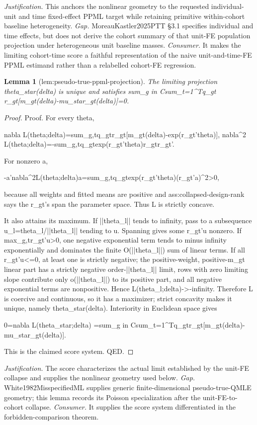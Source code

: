 \documentclass{article}
\newtheorem{lemma}{Lemma}
\begin{document}
\par\smallskip\noindent \textit{Justification.} This anchors the nonlinear geometry to the requested individual-unit and time fixed-effect PPML target while retaining primitive within-cohort baseline heterogeneity. \textit{Gap.} MoreauKastler2025PTT §3.1 specifies individual and time effects, but does not derive the cohort summary of that unit-FE population projection under heterogeneous unit baseline masses. \textit{Consumer.} It makes the limiting cohort-time score a faithful representation of the naive unit-and-time-FE PPML estimand rather than a relabelled cohort-FE regression.

\begin{lemma}[lem:pseudo-true-ppml-projection]\label{lem:pseudo-true-ppml-projection}
The limiting projection theta_star(delta) is unique and satisfies sum_{g in C}sum_{t=1}^Tq_gt r_gt[m_gt(delta)-mu_star_gt(delta)]=0.
\end{lemma}
\begin{proof}
Proof. For every theta,

  nabla L(theta;delta)=sum_{g,t}q_{gt}r_{gt}[m_{gt}(delta)-exp(r_{gt}'theta)],
  nabla^2 L(theta;delta)=-sum_{g,t}q_{gt}exp(r_{gt}'theta)r_{gt}r_{gt}'.

For nonzero a,

  -a'nabla^2L(theta;delta)a=sum_{g,t}q_{gt}exp(r_{gt}'theta)(r_{gt}'a)^2>0,

because all weights and fitted means are positive and ass:collapsed-design-rank says the r_{gt}'s span the parameter space. Thus L is strictly concave.

It also attains its maximum. If ||theta_l|| tends to infinity, pass to a subsequence u_l=theta_l/||theta_l|| tending to u. Spanning gives some r_{gt}'u nonzero. If max_{g,t}r_{gt}'u>0, one negative exponential term tends to minus infinity exponentially and dominates the finite O(||theta_l||) sum of linear terms. If all r_{gt}'u<=0, at least one is strictly negative; the positive-weight, positive-m_{gt} linear part has a strictly negative order-||theta_l|| limit, rows with zero limiting slope contribute only o(||theta_l||) to its positive part, and all negative exponential terms are nonpositive. Hence L(theta_l;delta)->-infinity. Therefore L is coercive and continuous, so it has a maximizer; strict concavity makes it unique, namely theta_star(delta). Interiority in Euclidean space gives

  0=nabla L(theta_star;delta)
   =sum_{g in C}sum_{t=1}^Tq_{gt}r_{gt}[m_{gt}(delta)-mu_star_{gt}(delta)].

This is the claimed score system. QED.
\end{proof}
\par\smallskip\noindent \textit{Justification.} The score characterizes the actual limit established by the unit-FE collapse and supplies the nonlinear geometry used below. \textit{Gap.} White1982MisspecifiedML supplies generic finite-dimensional pseudo-true-QMLE geometry; this lemma records its Poisson specialization after the unit-FE-to-cohort collapse. \textit{Consumer.} It supplies the score system differentiated in the forbidden-comparison theorem.
\end{document}
